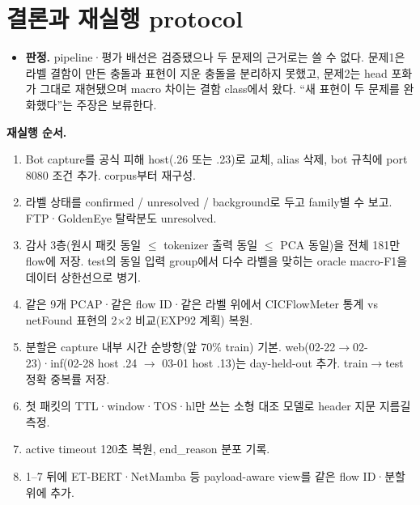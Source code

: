 \section{결론과 재실행 protocol}
\begin{itemize}
\item \textbf{판정.} pipeline·평가 배선은 검증됐으나 두 문제의 근거로는 쓸 수 없다. 문제1은 라벨 결함이 만든 충돌과 표현이 지운 충돌을 분리하지 못했고, 문제2는 head 포화가 그대로 재현됐으며 macro 차이는 결함 class에서 왔다. ``새 표현이 두 문제를 완화했다''는 주장은 보류한다.
\end{itemize}
\textbf{재실행 순서.}
\begin{enumerate}[leftmargin=*,itemsep=2pt]
\item Bot capture를 공식 피해 host(.26 또는 .23)로 교체, alias 삭제, bot 규칙에 port 8080 조건 추가. corpus부터 재구성.
\item 라벨 상태를 confirmed / unresolved / background로 두고 family별 수 보고. FTP·GoldenEye 탈락분도 unresolved.
\item 감사 3층(원시 패킷 동일 $\le$ tokenizer 출력 동일 $\le$ PCA 동일)을 전체 181만 flow에 저장. test의 동일 입력 group에서 다수 라벨을 맞히는 oracle macro-F1을 데이터 상한선으로 병기.
\item 같은 9개 PCAP·같은 flow ID·같은 라벨 위에서 CICFlowMeter 통계 vs netFound 표현의 2$\times$2 비교(EXP92 계획) 복원.
\item 분할은 capture 내부 시간 순방향(앞 70\% train) 기본. web(02-22$\to$02-23)·inf(02-28 host .24 $\to$ 03-01 host .13)는 day-held-out 추가. train$\to$test 정확 중복률 저장.
\item 첫 패킷의 TTL·window·TOS·hl만 쓰는 소형 대조 모델로 header 지문 지름길 측정.
\item active timeout 120초 복원, end\_reason 분포 기록.
\item 1--7 뒤에 ET-BERT·NetMamba 등 payload-aware view를 같은 flow ID·분할 위에 추가.
\end{enumerate}


